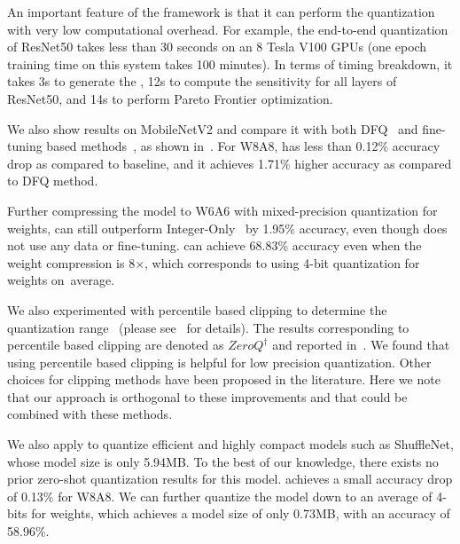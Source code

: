 An important feature of the \OURS framework is that it can perform the quantization with very low
computational overhead. For example, the end-to-end quantization of ResNet50 takes less than 30 seconds
 on an 8 Tesla V100 GPUs (one epoch training time on this system takes 100 minutes).
In terms of timing breakdown, it takes 3s to generate the \rg, 12s to compute the sensitivity for all layers of ResNet50, and 14s to perform Pareto Frontier optimization.


We also show \OURS results on MobileNetV2 and compare it with both DFQ~\cite{nagel2019data} and fine-tuning based methods~\cite{park2018value,jacob2018quantization}, as shown in~. 
For W8A8, \OURS has less than 0.12\% accuracy drop as compared to baseline, and it achieves 1.71\% higher
accuracy as compared to DFQ method. 

Further compressing the model to W6A6 with mixed-precision quantization for weights, \OURS can still outperform Integer-Only~\cite{jacob2018quantization} by 1.95\% accuracy, even though \OURS does not use any data or fine-tuning. 
\OURS can achieve 68.83\% accuracy even when the weight compression is 8$\times$, which corresponds to using 4-bit quantization for weights on~average.


We also experimented with percentile based clipping to determine the quantization range~\cite{li2019fully} (please see~ for details). The results corresponding to percentile based clipping
are denoted as $ZeroQ^\dagger$ and reported in~. We found
that using percentile based clipping is helpful for low precision quantization.
Other choices for clipping methods have been proposed in the literature.
Here we note that our approach is orthogonal to these improvements and that \OURS could
be combined with these methods. 




We also apply \OURS to quantize efficient and highly compact models such as ShuffleNet, whose model size is only 5.94MB.
To the best of our knowledge, there exists no prior zero-shot quantization results for this model.
\OURS  achieves a small accuracy drop of 0.13\% for W8A8.
We can further quantize the model down to an average of 4-bits for weights, which achieves a model size of
only 0.73MB, with an accuracy of 58.96\%.

